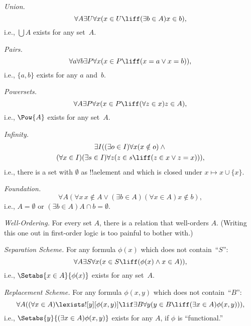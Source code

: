 \begin{defish}
\emph{Union.} 
\[
\forall A \exists U \forall x(x \in U \liff (\exists b \in A)x \in b),
\]
i.e., $\bigcup A$ exists for any set~$A$.
\end{defish}

\begin{defish}
\emph{Pairs.} 
\[
\forall a \forall b \exists P \forall x (x \in P \liff
(x = a \lor x = b)),
\]
i.e., $\{a, b\}$ exists for any $a$ and~$b$.
\end{defish}

\begin{defish}
\emph{Powersets.}
\[
\forall A \exists P \forall x(x \in P \liff (\forall z \in x)z \in A),
\]
i.e., $\Pow{A}$ exists for any set~$A$.
\end{defish}

\begin{defish}
\emph{Infinity.}
\begin{multline*}
\exists I((\exists o \in I)\forall x(x \notin o) \land {}\\
(\forall x \in I)(\exists s \in I)\forall z(z \in s \liff (z \in x \lor z = x))),
\end{multline*}
i.e., there is a set with $\emptyset$ as !!a{element} and which 
is closed under $x \mapsto x \cup \{x\}$.
\end{defish}

\begin{defish}
\emph{Foundation.}
\[
\forall A(\forall x\, x \notin A \lor (\exists b \in A)(\forall x \in A)x \notin b),
\]
i.e., $A = \emptyset$ or $(\exists b \in A)A\cap b = \emptyset$.
\end{defish}

\begin{defish}
\emph{Well-Ordering.} 
For every set $A$, there is a relation that well-orders $A$.
(Writing this one out in first-order logic is too painful to bother with.)
\end{defish}

\begin{defish}
\emph{Separation Scheme.}
For any formula $\phi(x)$ which does not contain~``$S$'':
\[
\forall A \exists S \forall x(x \in S \liff (\phi(x) \land x \in A)),
\]
i.e., $\Setabs{x \in A}{\phi(x)}$ exists for any set~$A$.
\end{defish}

\begin{defish}
\emph{Replacement Scheme.} For any formula $\phi(x, y)$ which does not contain~``$B$'':
\[
\forall A((\forall x \in A)\lexists![y][\phi(x,y)] \lif \exists B \forall y (y \in B \liff (\exists x \in A)\phi(x,y))),
\]
i.e., $\Setabs{y}{(\exists x \in A)\phi(x,y)}$ exists for any $A$, if $\phi$ is ``functional.''
\end{defish}

